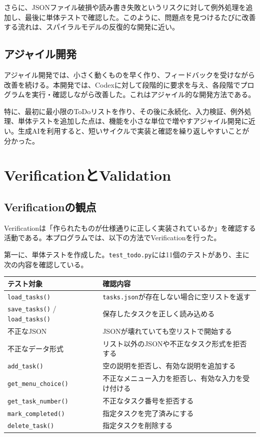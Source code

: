 \documentclass[uplatex,a4paper,11pt]{jsarticle}
\begin{document}
さらに、JSONファイル破損や読み書き失敗というリスクに対して例外処理を追加し、最後に単体テストで確認した。このように、問題点を見つけるたびに改善する流れは、スパイラルモデルの反復的な開発に近い。

\subsection{アジャイル開発}

アジャイル開発では、小さく動くものを早く作り、フィードバックを受けながら改善を続ける。本開発では、Codexに対して段階的に要求を与え、各段階でプログラムを実行・確認しながら改善した。これはアジャイル的な開発方法である。

特に、最初に最小限のToDoリストを作り、その後に永続化、入力検証、例外処理、単体テストを追加した点は、機能を小さな単位で増やすアジャイル開発に近い。生成AIを利用すると、短いサイクルで実装と確認を繰り返しやすいことが分かった。

\section{VerificationとValidation}

\subsection{Verificationの観点}

Verificationは「作られたものが仕様通りに正しく実装されているか」を確認する活動である。本プログラムでは、以下の方法でVerificationを行った。

第一に、単体テストを作成した。\texttt{test\_todo.py}には11個のテストがあり、主に次の内容を確認している。

\begin{longtable}{ll}
\toprule
テスト対象 & 確認内容 \\
\midrule
\texttt{load\_tasks()} & \texttt{tasks.json}が存在しない場合に空リストを返す \\
\texttt{save\_tasks()} / \texttt{load\_tasks()} & 保存したタスクを正しく読み込める \\
不正なJSON & JSONが壊れていても空リストで開始する \\
不正なデータ形式 & リスト以外のJSONや不正なタスク形式を拒否する \\
\texttt{add\_task()} & 空の説明を拒否し、有効な説明を追加する \\
\texttt{get\_menu\_choice()} & 不正なメニュー入力を拒否し、有効な入力を受け付ける \\
\texttt{get\_task\_number()} & 不正なタスク番号を拒否する \\
\texttt{mark\_completed()} & 指定タスクを完了済みにする \\
\texttt{delete\_task()} & 指定タスクを削除する \\
\bottomrule
\end{longtable}
\end{document}
